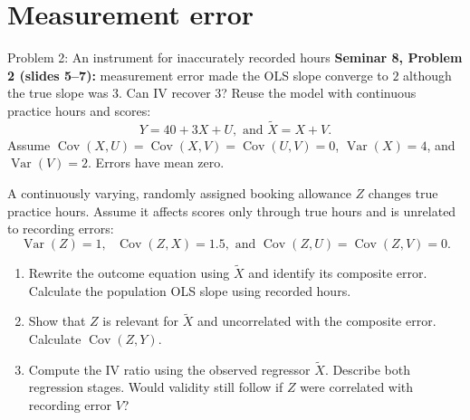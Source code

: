 \documentclass[notes,10pt, aspectratio=169]{beamer}
\newif\ifshowsolutions
\newcommand{\Var}{\operatorname{Var}}
\newcommand{\Cov}{\operatorname{Cov}}
\newcommand{\answerpart}[1]{\textcolor{blue}{\textbf{#1.}}\,}
\begin{document}
\ifshowsolutions
\begin{frame}{Solution 1: Isolate variation unrelated to prior performance}
\small
\setlength{\abovedisplayskip}{4pt}
\setlength{\belowdisplayskip}{4pt}
\answerpart{1}Write $Y=80-X+U$, where $U=W+R$. Then
\[
\Cov(X,U)=\Cov(X,W)+\Cov(X,R)=\Cov(X,W).
\]
The population OLS slope is
\[
b_{\mathrm{OLS}}=-1+\frac{\Cov(X,U)}{\Var(X)}=-1-1=\boxed{-2}.
\]
\answerpart{2}Relevance holds because $\Cov(Z,X)=2\ne0$. For exogeneity, use $U=W+R$ and covariance linearity:
\[
\begin{aligned}
\Cov(Z,U)&=\Cov(Z,W+R)\\
&=\Cov(Z,W)+\Cov(Z,R)=0+0=0.
\end{aligned}
\]
The two zeros follow from the assumptions that $Z$ is uncorrelated with both $W$ and $R$.
\par\smallskip
\answerpart{3}The first-stage and reduced-form slopes are
\[
\pi_1=\frac{\Cov(Z,X)}{\Var(Z)}=\frac24=0.5,
\text{ and }\gamma_1=\frac{\Cov(Z,Y)}{\Var(Z)}=\frac{-2}{4}=-0.5.
\]
\[
b_{\mathrm{IV}}=\frac{\gamma_1}{\pi_1}=\frac{-0.5}{0.5}=\boxed{-1}.
\]
Under these assumptions, one more pupil per class lowers the later score by 1 point. IV removes the omitted-variable component that makes the OLS slope $-2$.
\end{frame}
\fi

\section{Measurement error}
\begin{frame}{Problem 2: An instrument for inaccurately recorded hours}
\small
\setlength{\abovedisplayskip}{4pt}
\setlength{\belowdisplayskip}{4pt}
\textbf{Seminar 8, Problem 2 (slides 5--7):} measurement error made the OLS slope converge to $2$ although the true slope was $3$. Can IV recover $3$? Reuse the model with continuous practice hours and scores:
\[
Y=40+3X+U,\text{ and }\widetilde X=X+V.
\]
Assume $\Cov(X,U)=\Cov(X,V)=\Cov(U,V)=0$, $\Var(X)=4$, and $\Var(V)=2$. Errors have mean zero.
\par\smallskip
A continuously varying, randomly assigned booking allowance $Z$ changes true practice hours. Assume it affects scores only through true hours and is unrelated to recording errors:
\[
\Var(Z)=1,\text{ }\Cov(Z,X)=1.5,\text{ and }\Cov(Z,U)=\Cov(Z,V)=0.
\]
\begin{enumerate}
\item Rewrite the outcome equation using $\widetilde X$ and identify its composite error. Calculate the population OLS slope using recorded hours.
\item Show that $Z$ is relevant for $\widetilde X$ and uncorrelated with the composite error. Calculate $\Cov(Z,Y)$.
\item Compute the IV ratio using the observed regressor $\widetilde X$. Describe both regression stages. Would validity still follow if $Z$ were correlated with recording error $V$?
\end{enumerate}
\end{frame}
\end{document}
